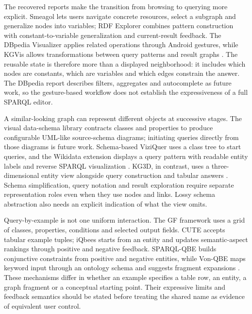 \documentclass[manuscript,review,screen]{acmart}
\begin{document}
The recovered reports make the transition from browsing to querying more explicit. Smeagol lets users navigate concrete resources, select a subgraph and generalize nodes into variables; RDF Explorer combines pattern construction with constant-to-variable generalization and current-result feedback. The DBpedia Visualizer applies related operations through Android gestures, while KGVis allows transformations between query patterns and result graphs \citep{V3-02525,V3-02210,V3-00229,V3-01622}. The reusable state is therefore more than a displayed neighborhood: it includes which nodes are constants, which are variables and which edges constrain the answer. The DBpedia report describes filters, aggregates and autocomplete as future work, so the gesture-based workflow does not establish the expressiveness of a full SPARQL editor.

A similar-looking graph can represent different objects at successive stages. The visual data-schema library contracts classes and properties to produce configurable UML-like source-schema diagrams; initiating queries directly from those diagrams is future work. Schema-based ViziQuer uses a class tree to start queries, and the Wikidata extension displays a query pattern with readable entity labels and reverse SPARQL visualization \citep{V3-00138,V3-02393,V3-02757}. KG3D, in contrast, uses a three-dimensional entity view alongside query construction and tabular answers \citep{V3-01616}. Schema simplification, query notation and result exploration require separate representation roles even when they use nodes and links. Lossy schema abstraction also needs an explicit indication of what the view omits.

Query-by-example is not one uniform interaction. The GF framework uses a grid of classes, properties, conditions and selected output fields. CUTE accepts tabular example tuples; iQbees starts from an entity and updates semantic-aspect rankings through positive and negative feedback. SPARQL-QBE builds conjunctive constraints from positive and negative entities, while Von-QBE maps keyword input through an ontology schema and suggests fragment expansions \citep{V3-00165,V3-00742,V3-01566,V3-02185,V3-02018}. These mechanisms differ in whether an example specifies a table row, an entity, a graph fragment or a conceptual starting point. Their expressive limits and feedback semantics should be stated before treating the shared name as evidence of equivalent user control.
\end{document}
